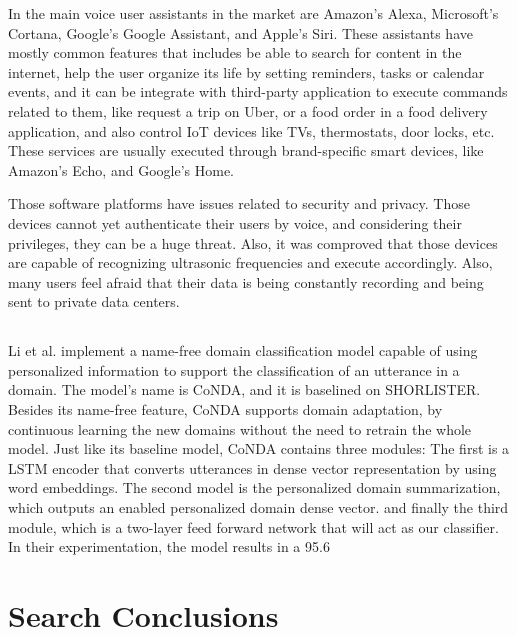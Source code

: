 In \cite{Hoy201881} the main voice user assistants in the market are Amazon's Alexa, Microsoft's Cortana, Google's Google Assistant, and Apple's Siri. These assistants have mostly common features that includes be able to search for content in the internet, help the user organize its life by setting reminders, tasks or calendar events, and it can be integrate with third-party application to execute commands related to them, like request a trip on Uber, or a food order in a food delivery application, and also control IoT devices like TVs, thermostats, door locks, etc. These services are usually executed through brand-specific smart devices, like Amazon's Echo, and Google's Home.

Those software platforms have issues related to security and privacy. Those devices cannot yet authenticate their users by voice, and considering their privileges, they can be a huge threat. Also, it was comproved that those devices are capable of recognizing ultrasonic frequencies and execute accordingly. Also, many users feel afraid that their data is being constantly recording and being sent to private data centers.

\subsection{\RQIII}

\cite{Li20193784}
Li et al. implement a name-free domain classification model capable of using personalized information to support the classification of an utterance in a domain. The model’s name is CoNDA, and it is baselined on SHORLISTER. Besides its name-free feature, CoNDA supports domain adaptation, by continuous learning the new domains without the need to retrain the whole model. Just like its baseline model, CoNDA contains three modules: The first is a LSTM encoder that converts utterances in dense vector representation by using word embeddings. The second model is the personalized domain summarization, which outputs an enabled personalized domain dense vector. and finally the third module, which is a two-layer feed forward network that will act as our classifier. In their experimentation, the model results in a 95.6%

\section{Search Conclusions}

